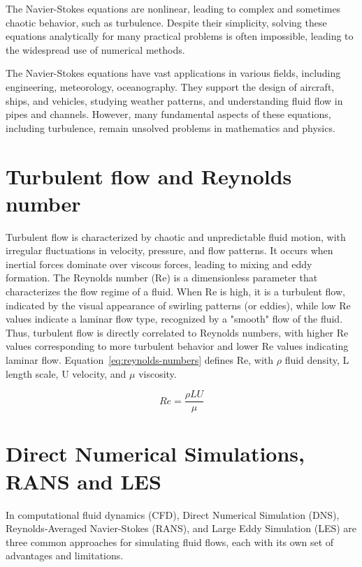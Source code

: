 The Navier-Stokes equations are nonlinear, leading to complex and sometimes chaotic behavior, such as turbulence. Despite their simplicity, solving these equations analytically for many practical problems is often impossible, leading to the widespread use of numerical methods.

The Navier-Stokes equations have vast applications in various fields, including engineering, meteorology, oceanography. They support the design of aircraft, ships, and vehicles, studying weather patterns, and understanding fluid flow in pipes and channels. However, many fundamental aspects of these equations, including turbulence, remain unsolved problems in mathematics and physics.

\section{Turbulent flow and Reynolds number}
\label{sec:TurbulentFlowAndReynoldsNumber} 

Turbulent flow is characterized by chaotic and unpredictable fluid motion, with irregular fluctuations in velocity, pressure, and flow patterns. It occurs when inertial forces dominate over viscous forces, leading to mixing and eddy formation. The Reynolds number (Re) is a dimensionless parameter that characterizes the flow regime of a fluid. When Re is high, it is a turbulent flow, indicated by the visual appearance of swirling patterns (or eddies), while low Re values indicate a laminar flow type, recognized by a "smooth" flow of the fluid. Thus, turbulent flow is directly correlated to Reynolds numbers, with higher Re values corresponding to more turbulent behavior and lower Re values indicating laminar flow. Equation~\ref{eq:reynolds-numbers} defines Re, with $\rho$ fluid density, L length scale, U velocity, and $\mu$ viscosity.

\begin{equation}
    Re = \frac{\rho LU}{\mu}
    \label{eq:reynolds-numbers}
\end{equation}

\section{Direct Numerical Simulations, RANS and LES}
\label{sec:DirectNumericalSimulationsRANSAndLES} 

In computational fluid dynamics (CFD), Direct Numerical Simulation (DNS), Reynolds-Averaged Navier-Stokes (RANS), and Large Eddy Simulation (LES) are three common approaches for simulating fluid flows, each with its own set of advantages and limitations.

